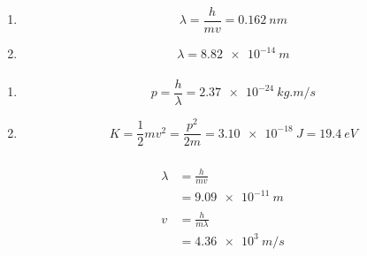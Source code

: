 \documentclass{article}
\begin{document}
\begin{enumerate}
  \item \[\lambda = \frac{h}{m v} = \qty{0.162}{nm}\]

  \item \[\lambda = \qty{8.82e-14}{m}\]
\end{enumerate}

\setcounter{subsubsection}{2}
\subsubsection{}

\begin{enumerate}
  \item \[p = \frac{h}{\lambda} = \qty{2.37e-24}{kg.m/s}\]

  \item \[K = \frac{1}{2} m v^2 = \frac{p^2}{2 m} = \qty{3.10e-18}{J} = \qty{19.4}{eV}\]
\end{enumerate}

\setcounter{subsubsection}{4}
\subsubsection{}

\begin{align*}
  \lambda & = \frac{h}{m v}       \\
          & = \qty{9.09e-11}{m}   \\ \\
  v       & = \frac{h}{m \lambda} \\
          & = \qty{4.36e3}{m/s}
\end{align*}

\setcounter{subsubsection}{6}
\subsubsection{}
\end{document}
